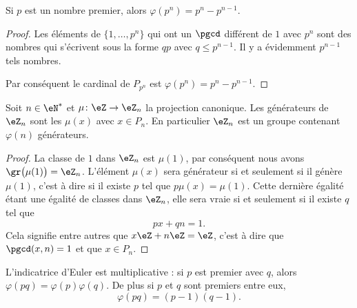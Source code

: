 \begin{lemma}
    Si \( p\) est un nombre premier, alors \( \varphi(p^n)=p^n-p^{n-1}\).
\end{lemma}

\begin{proof}
    Les éléments de \( \{ 1,\ldots,p^n \}\) qui ont un \( \pgcd\) différent de \( 1\) avec \( p^n\) sont des nombres qui s'écrivent sous la forme \( qp\) avec \( q\leq p^{n-1}\). Il y a évidemment \( p^{n-1}\) tels nombres.

    Par conséquent le cardinal de \( P_{p^n}\) est \( \varphi(p^{n})=p^n-p^{n-1}\).
\end{proof}

\begin{proposition}     \label{PropZnmuphiGensn}
    Soit \( n\in\eN^*\) et \( \mu\colon \eZ\to \eZ_n\) la projection canonique. Les générateurs de \( \eZ_n\) sont les \( \mu(x)\) avec \( x\in P_n\). En particulier \( \eZ_n\) est un groupe contenant \( \varphi(n)\) générateurs.
\end{proposition}

\begin{proof}
    La classe de \( 1\) dans \( \eZ_n\) est \( \mu(1)\), par conséquent nous avons \( \gr\big( \mu(1) \big)=\eZ_n\). L'élément \( \mu(x)\) sera générateur si et seulement si il génère \( \mu(1)\), c'est à dire si il existe \( p\) tel que \( p\mu(x)=\mu(1)\). Cette dernière égalité étant une égalité de classes dans \( \eZ_n\), elle sera vraie si et seulement si il existe \( q\) tel que
    \begin{equation}
        px+qn=1.
    \end{equation}
    Cela signifie entre autres que \( x\eZ+n\eZ=\eZ\), c'est à dire que \( \pgcd(x,n)=1\) et que \( x\in P_n\).
\end{proof}

\begin{corollary}       \label{CorlvTmsf}
    L'indicatrice d'Euler est multiplicative : si \( p\) est premier avec \( q\), alors \( \varphi(pq)=\varphi(p)\varphi(q)\). De plus si \( p\) et \( q\) sont premiers entre eux,
    \begin{equation}
        \varphi(pq)=(p-1)(q-1).
    \end{equation}
\end{corollary}

